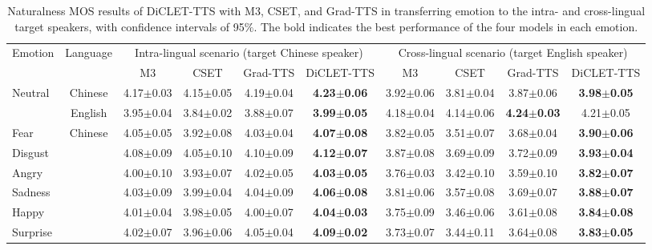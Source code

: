 \documentclass[journal,comsoc]{IEEEtran}
\begin{document}
\begin{table*}[t]
\caption{Naturalness MOS results of DiCLET-TTS with M3, CSET, and Grad-TTS in transferring emotion to the intra- and cross-lingual target speakers, with confidence intervals of 95$\%$. The bold indicates the best performance of the four models in each emotion.}
\label{tab:naturalness}
\setlength{\tabcolsep}{2.8mm}
\centering
\begin{tabular}{l|c|cccc|cccc}
\toprule
\multirow{2}{*}{Emotion} & \multirow{2}{*}{Language} & \multicolumn{4}{c|}{Intra-lingual scenario (target Chinese speaker)}       & \multicolumn{4}{c}{Cross-lingual scenario (target English speaker)}         \\ \cmidrule{3-10}
                         &                           & \multicolumn{1}{c}{M3} & \multicolumn{1}{c}{CSET} & \multicolumn{1}{c}{Grad-TTS} & \multicolumn{1}{c|}{DiCLET-TTS} & \multicolumn{1}{c}{M3} & \multicolumn{1}{c}{CSET} & \multicolumn{1}{c}{Grad-TTS} & \multicolumn{1}{c}{DiCLET-TTS} \\ \midrule
\multirow{2}{*}{Neutral}   &  Chinese                     & 4.17$\pm$0.03 & 4.15$\pm$0.05 & 4.19$\pm$0.04 & \bf{4.23}$\pm$0.06 & 3.92$\pm$0.06 & 3.81$\pm$0.04 & 3.87$\pm$0.06      & \bf{3.98}$\pm$0.05  \\
                           &  English                     & 3.95$\pm$0.04 & 3.84$\pm$0.02 & 3.88$\pm$0.07 & \bf{3.99}$\pm$0.05 & 4.18$\pm$0.04 & 4.14$\pm$0.06 & \bf{4.24}$\pm$0.03 & 4.21$\pm$0.05       \\
\midrule
Fear      &  \multirow{6}{*}{Chinese}    & 4.05$\pm$0.05 & 3.92$\pm$0.08 & 4.03$\pm$0.04 & \bf{4.07}$\pm$0.08 & 3.82$\pm$0.05 & 3.51$\pm$0.07 & 3.68$\pm$0.04      & \bf{3.90}$\pm$0.06  \\
Disgust   &                              & 4.08$\pm$0.09 & 4.05$\pm$0.10 & 4.10$\pm$0.09 & \bf{4.12}$\pm$0.07 & 3.87$\pm$0.08 & 3.69$\pm$0.09 & 3.72$\pm$0.09      & \bf{3.93}$\pm$0.04  \\
Angry     &                              & 4.00$\pm$0.10 & 3.93$\pm$0.07 & 4.02$\pm$0.05 & \bf{4.03}$\pm$0.05 & 3.76$\pm$0.03 & 3.42$\pm$0.10 & 3.59$\pm$0.10      & \bf{3.82}$\pm$0.07  \\
Sadness   &                              & 4.03$\pm$0.09 & 3.99$\pm$0.04 & 4.04$\pm$0.09 & \bf{4.06}$\pm$0.08 & 3.81$\pm$0.06 & 3.57$\pm$0.08 & 3.69$\pm$0.07      & \bf{3.88}$\pm$0.07  \\
Happy     &                              & 4.01$\pm$0.04 & 3.98$\pm$0.05 & 4.00$\pm$0.07 & \bf{4.04}$\pm$0.03 & 3.75$\pm$0.09 & 3.46$\pm$0.06 & 3.61$\pm$0.08      & \bf{3.84}$\pm$0.08  \\
Surprise  &                              & 4.02$\pm$0.07 & 3.96$\pm$0.06 & 4.05$\pm$0.04 & \bf{4.09}$\pm$0.02 & 3.73$\pm$0.07 & 3.44$\pm$0.11 & 3.64$\pm$0.08      & \bf{3.83}$\pm$0.05  \\
\bottomrule
\end{tabular}
\end{table*}
\end{document}
